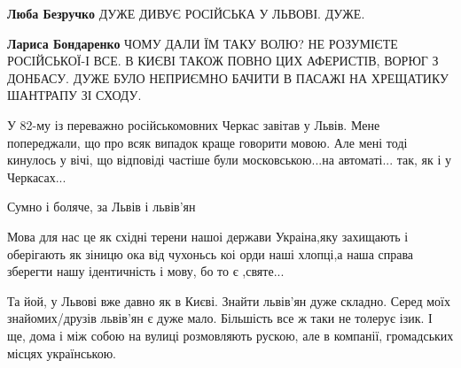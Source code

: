 \begin{itemize}
\begin{itemize}
\textbf{Люба Безручко} ДУЖЕ ДИВУЄ РОСІЙСЬКА У ЛЬВОВІ. ДУЖЕ.

 
\textbf{Лариса Бондаренко} ЧОМУ ДАЛИ ЇМ ТАКУ ВОЛЮ? НЕ РОЗУМІЄТЕ РОСІЙСЬКОЇ-І
ВСЕ. В КИЄВІ ТАКОЖ ПОВНО ЦИХ АФЕРИСТІВ, ВОРЮГ З ДОНБАСУ. ДУЖЕ БУЛО НЕПРИЄМНО
БАЧИТИ В ПАСАЖІ НА ХРЕЩАТИКУ ШАНТРАПУ ЗІ СХОДУ.
\end{itemize}

 

У 82-му із переважно російськомовних Черкас завітав у Львів. Мене попереджали,
що про всяк випадок краще говорити мовою. Але мені тоді кинулось у вічі, що
відповіді частіше були московською...на автоматі... так, як і у Черкасах...


 
Сумно і боляче, за Львів і львів'ян

 

Мова для нас це як східні терени нашоі держави Украіна,яку захищають і
оберігають як зіницю ока від чухоньсь коі орди наші хлопці,а наша справа
зберегти нашу ідентичність і мову, бо то є ,святе...

 

Та йой, у Львові вже давно як в Києві. Знайти львів'ян дуже складно. Серед моїх
знайомих/друзів львів'ян є дуже мало. Більшість все ж таки не толерує ізик. І
ще, дома і між собою на вулиці розмовляють рускою, але в компанії, громадських
місцях українською.



\end{itemize}
